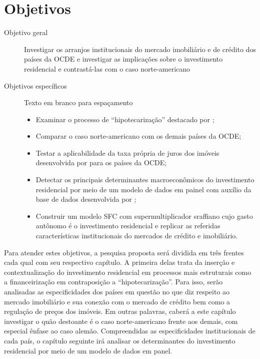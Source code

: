 \section{Objetivos}\label{OBJ}

\begin{description}
	\item[Objetivo geral] Investigar os arranjos institucionais do mercado imobiliário e de crédito dos países da OCDE e investigar as implicações sobre o investimento residencial e contrastá-las com o caso norte-americano
	\item[Objetivos específicos] {\color{white} Texto em branco para espaçamento}
	\begin{itemize}
		\item Examinar o processo de ``hipotecarização'' destacado por \textcite{jorda_great_2014};
		\item Comparar o caso norte-americano com os demais países da OCDE;
		\item Testar a aplicabilidade da taxa própria de juros dos imóveis desenvolvida por \textcite{teixeira_crescimento_2015} para os países da OCDE; 
		\item Detectar os principais determinantes macroeconômicos do investimento residencial por meio de um modelo de dados em painel com auxílio da base de dados desenvolvida por \textcite{jorda_great_2014};
		\item Construir um modelo SFC com supermultiplicador sraffiano cujo gasto autônomo é o investimento residencial e replicar as referidas características institucionais do mercados de crédito e imobiliário.
	\end{itemize}
\end{description}


Para atender estes objetivos, a pesquisa proposta será dividida em três frentes cada qual com seu respectivo capítulo.
A primeira delas trata da inserção e contextualização do investimento residencial em processos mais estruturais como a financeirização em contraposição a ``hipotecarização''. Para isso, serão analisadas as especificidades dos países em questão no que diz respeito ao mercado imobiliário e sua conexão com o mercado de crédito bem como a regulação de preços dos imóveis. Em outras palavras, caberá a este capítulo investigar o quão destoante é o caso norte-americano frente aos demais, com especial ênfase ao caso alemão. Compreendidas as especificidades institucionais de cada país, o capítulo seguinte irá analisar os determinantes do investimento residencial por meio de um modelo de dados em panel. 

